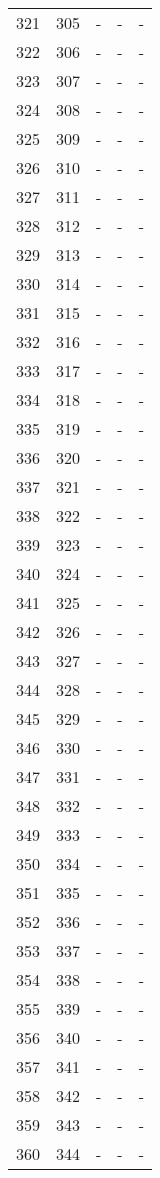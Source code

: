 \documentclass[10pt]{article}
\begin{document}
\begin {longtable}{l r r r r}
321 & 305 & - & - & - \\
322 & 306 & - & - & - \\
323 & 307 & - & - & - \\
324 & 308 & - & - & - \\
325 & 309 & - & - & - \\
326 & 310 & - & - & - \\
327 & 311 & - & - & - \\
328 & 312 & - & - & - \\
329 & 313 & - & - & - \\
330 & 314 & - & - & - \\
331 & 315 & - & - & - \\
332 & 316 & - & - & - \\
333 & 317 & - & - & - \\
334 & 318 & - & - & - \\
335 & 319 & - & - & - \\
336 & 320 & - & - & - \\
337 & 321 & - & - & - \\
338 & 322 & - & - & - \\
339 & 323 & - & - & - \\
340 & 324 & - & - & - \\
341 & 325 & - & - & - \\
342 & 326 & - & - & - \\
343 & 327 & - & - & - \\
344 & 328 & - & - & - \\
345 & 329 & - & - & - \\
346 & 330 & - & - & - \\
347 & 331 & - & - & - \\
348 & 332 & - & - & - \\
349 & 333 & - & - & - \\
350 & 334 & - & - & - \\
351 & 335 & - & - & - \\
352 & 336 & - & - & - \\
353 & 337 & - & - & - \\
354 & 338 & - & - & - \\
355 & 339 & - & - & - \\
356 & 340 & - & - & - \\
357 & 341 & - & - & - \\
358 & 342 & - & - & - \\
359 & 343 & - & - & - \\
360 & 344 & - & - & - \\

\end{longtable}
\end{document}

